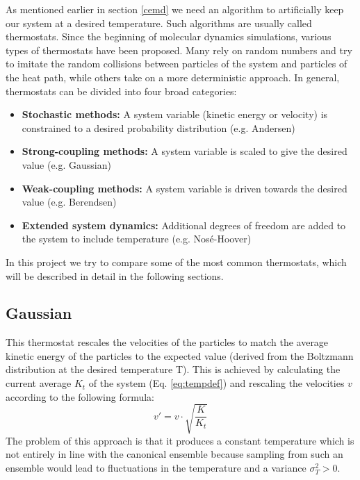 As mentioned earlier in section \ref{cemd} we need an algorithm to artificially keep our system at a desired temperature. Such algorithms are usually called thermostats. Since the beginning of molecular dynamics simulations, various types of thermostats have been proposed. Many rely on random numbers and try to imitate the random collisions between particles of the system and particles of the heat path, while others take on a more deterministic approach. In general, thermostats can be divided into four broad categories: 
\begin{itemize}
\item \textbf{Stochastic methods:} A system variable (kinetic energy or velocity) is constrained to a desired probability distribution (e.g. Andersen)
\item \textbf{Strong-coupling methods:} A system variable is scaled to give the desired value (e.g. Gaussian) 
\item \textbf{Weak-coupling methods:} A system variable is driven towards the desired value (e.g. Berendsen) 
\item \textbf{Extended system dynamics:} Additional degrees of freedom are added to the system to include temperature (e.g. Nosé-Hoover) 
\end{itemize}  
In this project we try to compare some of the most common thermostats, which will be described in detail in the following sections. 

\subsection{Gaussian}\label{th:gaussian}
This thermostat rescales the velocities of the particles to match the average kinetic energy of the particles to the expected value (derived from the Boltzmann distribution at the desired temperature T). This is achieved by calculating the current average $K_t$ of the system (Eq. \eqref{eq:tempdef}) and rescaling the velocities $v$ according to the following formula:
\begin{equation}
v'  = v\cdot \sqrt{\frac{K}{K_t}}\label{eq:gauss}
\end{equation}
The problem of this approach is that it produces a constant temperature which is not entirely in line with the canonical ensemble because sampling from such an ensemble would lead to fluctuations in the temperature and a variance $\sigma_T^2 > 0$.

